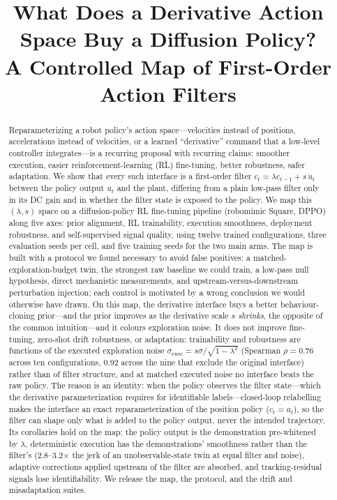 \documentclass[conference]{IEEEtran}
\newcommand{\sexec}{\sigma_{\mathrm{exec}}}
\newcommand{\todo}[1]{\textcolor{red}{[#1]}}
\begin{document}
\title{What Does a Derivative Action Space Buy a Diffusion Policy?\\
\Large A Controlled Map of First-Order Action Filters}

\author{
\IEEEauthorblockA{\todo{affiliation}}}

\maketitle

\begin{abstract}
Reparameterizing a robot policy's action space---velocities instead of positions, accelerations instead of velocities, or a learned ``derivative'' command that a low-level controller integrates---is a recurring proposal with recurring claims: smoother execution, easier reinforcement-learning (RL) fine-tuning, better robustness, safer adaptation. We show that every such interface is a first-order filter $c_t=\lambda c_{t-1}+s\,u_t$ between the policy output $u_t$ and the plant, differing from a plain low-pass filter only in its DC gain and in whether the filter state is exposed to the policy. We map this $(\lambda,s)$ space on a diffusion-policy RL fine-tuning pipeline (robomimic Square, DPPO) along five axes: prior alignment, RL trainability, execution smoothness, deployment robustness, and self-supervised signal quality, using twelve trained configurations, three evaluation seeds per cell, and five training seeds for the two main arms. The map is built with a protocol we found necessary to avoid false positives: a matched-exploration-budget twin, the strongest raw baseline we could train, a low-pass null hypothesis, direct mechanistic measurements, and upstream-versus-downstream perturbation injection; each control is motivated by a wrong conclusion we would otherwise have drawn. On this map, the derivative interface buys a better behaviour-cloning prior---and the prior improves as the derivative scale $s$ \emph{shrinks}, the opposite of the common intuition---and it colours exploration noise. It does not improve fine-tuning, zero-shot drift robustness, or adaptation: trainability and robustness are functions of the executed exploration noise $\sexec=s\sigma/\sqrt{1-\lambda^2}$ (Spearman $\rho=0.76$ across ten configurations, $0.92$ across the nine that exclude the original interface) rather than of filter structure, and at matched executed noise no interface beats the raw policy. The reason is an identity: when the policy observes the filter state---which the derivative parameterization requires for identifiable labels---closed-loop relabelling makes the interface an exact reparameterization of the position policy ($c_t=a_t$), so the filter can shape only what is added to the policy output, never the intended trajectory. Its corollaries hold on the map: the policy output is the demonstration pre-whitened by $\lambda$, deterministic execution has the demonstrations' smoothness rather than the filter's (2.8--3.2$\times$ the jerk of an unobservable-state twin at equal filter and noise), adaptive corrections applied upstream of the filter are absorbed, and tracking-residual signals lose identifiability. We release the map, the protocol, and the drift and misadaptation suites.

\end{abstract}
\end{document}
